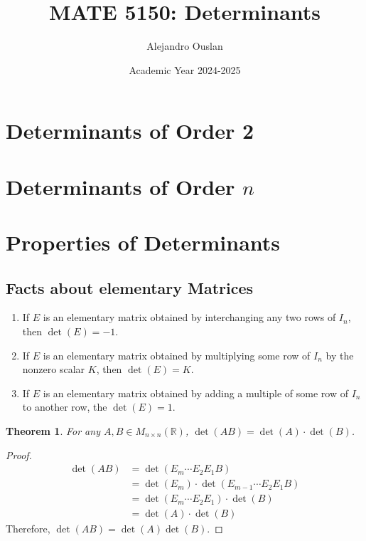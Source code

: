 \documentclass[10pt, oneside]{article}
\title{MATE 5150: Determinants}
\author{Alejandro Ouslan}
\date{Academic Year 2024-2025}
\newcommand{\R}{\mathbb{R}}
\newtheorem{thm}{Theorem}
\begin{document}
\maketitle
\tableofcontents

\vspace{.25in}

\section{Determinants of Order 2}

\section{Determinants of Order $n$}

\section{Properties of Determinants}

\subsection{Facts about elementary Matrices}

\begin{enumerate}
	\item If $E$ is an elementary matrix obtained by interchanging any two rows of $I_n$, then $\det(E) = -1$.
	\item If $E$ is an elementary matrix obtained by multiplying some row of $I_n$ by the nonzero scalar $K$, then $\det(E) = K$.
	\item If $E$ is an elementary matrix obtained by adding a multiple of some row of $I_n$ to another row, the $\det(E) = 1$.
\end{enumerate}

\begin{thm}
	For any $A,B \in M_{n \times n}(\R)$, $\det(AB) = \det(A)\cdot \det(B)$.
\end{thm}

\begin{proof}
	\begin{align*}
		\det(AB) & = \det(E_m \cdots E_2E_1B)                     \\
		         & = \det(E_m) \cdot \det(E_{m-1} \cdots E_2E_1B) \\
		         & = \det(E_m \cdots E_2E_1) \cdot \det(B)        \\
		         & = \det(A) \cdot \det(B)
	\end{align*}
	Therefore, $\det(AB) = \det(A)\det(B)$.
\end{proof}
\end{document}
